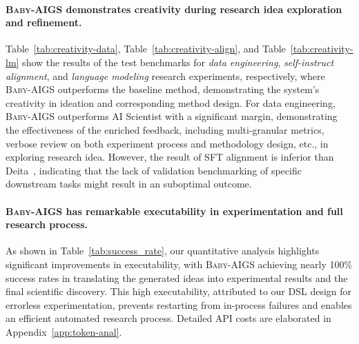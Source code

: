 \documentclass{article} %
\newcommand{\AIGSSys}{\textsc{Baby-AIGS}\xspace}
\newcommand{\DSL}{\textsc{DSL}\xspace}
\begin{document}
\paragraph{\AIGSSys demonstrates creativity during research idea exploration and refinement.}

Table~\ref{tab:creativity-data}, Table~\ref{tab:creativity-align}, and Table~\ref{tab:creativity-lm} show the results of the test benchmarks for \textit{data engineering}, \textit{self-instruct alignment}, and \textit{language modeling} research experiments, respectively, where \AIGSSys outperforms the baseline method, demonstrating the system's creativity in ideation and corresponding method design. For data engineering, \AIGSSys outperforms AI Scientist with a significant margin, demonstrating the effectiveness of the enriched feedback, including multi-granular metrics, verbose review on both experiment process and methodology design, etc., in exploring research idea. However, the result of SFT alignment is inferior than Deita~\citep{deita}, indicating that the lack of validation benchmarking of specific downstream tasks might result in an suboptimal outcome. 


\begin{table}[t]
\centering
{}
\caption{Success rates on three selected tasks of AI Scientist and Baby-AIGS. Exp.~SR denotes the times a system successfully conducted experiments out of all trials, and Overall SR denotes the times a system produces the final scientific discoveries. Higher numbers indicate better executability.}
\label{tab:success_rate}
\vspace{-1em}
\end{table}

\paragraph{\AIGSSys has remarkable executability in experimentation and full research process.}

As shown in Table~\ref{tab:success_rate}, our quantitative analysis highlights significant improvements in executability, with \AIGSSys achieving nearly 100\% success rates in translating the generated ideas into experimental results and the final scientific discovery. This high executability, attributed to our \DSL design for errorless experimentation, prevents restarting from in-process failures and enables an efficient automated research process. Detailed API costs are elaborated in Appendix~\ref{app:token-anal}.  
\end{document}
